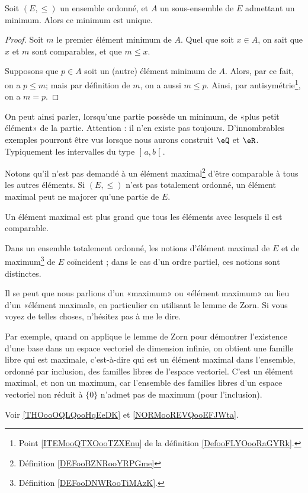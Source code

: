 \begin{proposition}\label{PROPooUniciteMinMax}
	Soit \( (E, \leq) \) un ensemble ordonné, et \( A \) un sous-ensemble de \( E \) admettant un minimum. Alors ce minimum est unique.
\end{proposition}

\begin{proof}
	Soit \( m \) le premier élément minimum de \( A \). Quel que soit \(x \in A \), on sait que \( x \) et \( m \) sont comparables, et que \( m \leq x \).

	Supposons que \( p \in A \) soit un (autre) élément minimum de \( A \). Alors, par ce fait, on a \( p \leq m \); mais par définition de \( m \), on a aussi \( m \leq p \). Ainsi, par antisymétrie\footnote{Point \ref{ITEMooQTXOooTZXEnu} de la définition \ref{DefooFLYOooRaGYRk}.}, on a \( m = p\).
\end{proof}

\begin{normaltext}\label{NORMooPlusPetitElement}
	On peut ainsi parler, lorsqu'une partie possède un minimum, de «plus petit élément» de la partie. Attention : il n'en existe pas toujours. D'innombrables exemples pourront être vus lorsque nous aurons construit \( \eQ\) et \( \eR\). Typiquement les intervalles du type \( \mathopen] a , b \mathclose[\).
\end{normaltext}


\begin{normaltext}    \label{NORMooVHIBooJAOsou}
	Notons qu'il n'est pas demandé à un élément maximal\footnote{Définition \ref{DEFooBZNRooYRPGme}} d'être comparable à tous les autres éléments. Si \( (E,\leq)\) n'est pas totalement ordonné, un élément maximal peut ne majorer qu'une partie de \( E\).

	Un élément maximal est plus grand que tous les éléments avec lesquels il est comparable.

	Dans un ensemble totalement ordonné, les notions d'élément maximal de \( E\) et de maximum\footnote{Définition \ref{DEFooDNWRooTiMAzK}.} de \( E\) coïncident ; dans le cas d'un ordre partiel, ces notions sont distinctes.

	Il se peut que nous parlions d'un «maximum» ou «élément maximum»  au lieu d'un «élément maximal», en particulier en utilisant le lemme de Zorn. Si vous voyez de telles choses, n'hésitez pas à me le dire.

	Par exemple, quand on applique le lemme de Zorn pour démontrer l'existence d'une base dans un espace vectoriel de dimension infinie, on obtient une famille libre qui est maximale, c'est-à-dire qui est un élément maximal dans l'ensemble, ordonné par inclusion, des familles libres de l'espace vectoriel. C'est un élément maximal, et non un maximum, car l'ensemble des familles libres d'un espace vectoriel non réduit à \( \{ 0 \}\) n'admet pas de maximum (pour l'inclusion).

	Voir \ref{THOooOQLQooHqEeDK} et \ref{NORMooREVQooEFJWta}.		%
\end{normaltext}

